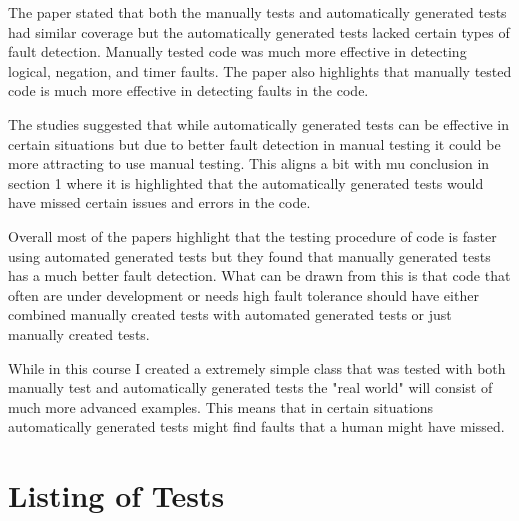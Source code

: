 \documentclass{article}
\begin{document}
The paper stated that both the manually tests and automatically generated tests had similar coverage but the automatically generated tests lacked certain types of fault detection. Manually tested code was much more effective in detecting logical, negation, and timer faults. The paper  \cite{enoiu2016controlled} also highlights that manually tested code is much more effective in detecting faults in the code.

The studies suggested that while automatically generated tests can be effective in certain situations but due to better fault detection in manual testing it could be more attracting to use manual testing. This aligns a bit with mu conclusion in section 1 where it is highlighted that the automatically generated tests would have missed certain issues and errors in the code.

Overall most of the papers highlight that the testing procedure of code is faster using automated generated tests but they found that manually generated tests has a much better fault detection. What can be drawn from this is that code that often are under development or needs high fault tolerance should have either combined manually created tests with automated generated tests or just manually created tests.

While in this course I created a extremely simple class that was tested with both manually test and automatically generated tests the "real world" will consist of much more advanced examples. This means that in certain situations automatically generated tests might find faults that a human might have missed.


\newpage
\section{Listing of Tests} \label{sec:Listing}
\end{document}
